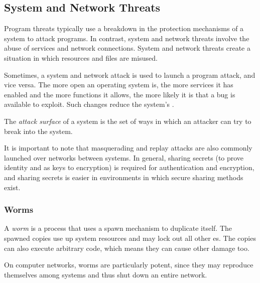 \subsection{System and Network Threats}\label{subsec:System_Network_Threats}
Program threats typically use a breakdown in the protection mechanisms of a system to attack programs.
In contrast, system and network threats involve the abuse of services and network connections.
System and network threats create a situation in which  resources and  files are misused.

Sometimes, a system and network attack is used to launch a program attack, and vice versa.
The more open an operating system is, the more services it has enabled and the more functions it allows, the more likely it is that a bug is available to exploit.
Such changes reduce the system’s .

\begin{definition}\label{def:Attack_Surface}
  The \emph{attack surface} of a system is the set of ways in which an attacker can try to break into the system.
\end{definition}

It is important to note that masquerading and replay attacks are also commonly launched over networks between systems.
In general, sharing secrets (to prove identity and as keys to encryption) is required for authentication and encryption, and sharing secrets is easier in environments in which secure sharing methods exist.

\subsubsection{Worms}\label{subsubsec:Worms}
\begin{definition}[Worm]\label{def:Worm}
  A \emph{worm} is a process that uses a spawn mechanism to duplicate itself.
  The spawned copies use up system resources and may lock out all other es.
  The copies can also execute arbitrary code, which means they can cause other damage too.
\end{definition}

On computer networks, worms are particularly potent, since they may reproduce themselves among systems and thus shut down an entire network.


